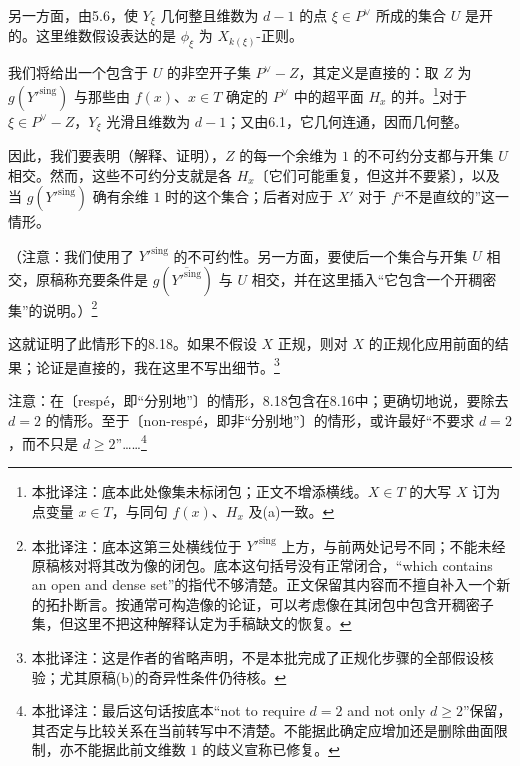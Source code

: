 \documentclass[openany]{ctexbook}
\newcommand{\note}[1]{\footnote{本批译注：#1}}
\begin{document}
另一方面，由5.6，使 $Y_\xi$ 几何整且维数为 $d-1$ 的点 $\xi\in P^\vee$ 所成的集合 $U$ 是开的。这里维数假设表达的是 $\phi_\xi$ 为 $X_{k(\xi)}$-正则。

我们将给出一个包含于 $U$ 的非空开子集 $P^\vee-Z$，其定义是直接的：取 $Z$ 为 $g(Y'^{\mathrm{sing}})$ 与那些由 $f(x)$、$x\in T$ 确定的 $P^\vee$ 中的超平面 $H_x$ 的并。\note{底本此处像集未标闭包；正文不增添横线。$X\in T$ 的大写 $X$ 订为点变量 $x\in T$，与同句 $f(x)$、$H_x$ 及(a)一致。}对于 $\xi\in P^\vee-Z$，$Y_\xi$ 光滑且维数为 $d-1$；又由6.1，它几何连通，因而几何整。

因此，我们要表明（解释、证明），$Z$ 的每一个余维为 $1$ 的不可约分支都与开集 $U$ 相交。然而，这些不可约分支就是各 $H_x$〔它们可能重复，但这并不要紧〕，以及当 $g(Y'^{\mathrm{sing}})$ 确有余维 $1$ 时的这个集合；后者对应于 $X'$ 对于 $f$“不是直纹的”这一情形。

（注意：我们使用了 $Y'^{\mathrm{sing}}$ 的不可约性。另一方面，要使后一个集合与开集 $U$ 相交，原稿称充要条件是 $g(\overline{Y'^{\mathrm{sing}}})$ 与 $U$ 相交，并在这里插入“它包含一个开稠密集”的说明。）\note{底本这第三处横线位于 $Y'^{\mathrm{sing}}$ 上方，与前两处记号不同；不能未经原稿核对将其改为像的闭包。底本这句括号没有正常闭合，“which contains an open and dense set”的指代不够清楚。正文保留其内容而不擅自补入一个新的拓扑断言。按通常可构造像的论证，可以考虑像在其闭包中包含开稠密子集，但这里不把这种解释认定为手稿缺文的恢复。}

这就证明了此情形下的8.18。如果不假设 $X$ 正规，则对 $X$ 的正规化应用前面的结果；论证是直接的，我在这里不写出细节。\note{这是作者的省略声明，不是本批完成了正规化步骤的全部假设核验；尤其原稿(b)的奇异性条件仍待核。}

注意：在〔respé，即“分别地”〕的情形，8.18包含在8.16中；更确切地说，要除去 $d=2$ 的情形。至于〔non-respé，即非“分别地”〕的情形，或许最好“不要求 $d=2$，而不只是 $d\ge2$”……\note{最后这句话按底本“not to require $d=2$ and not only $d\ge2$”保留，其否定与比较关系在当前转写中不清楚。不能据此确定应增加还是删除曲面限制，亦不能据此前文维数 $1$ 的歧义宣称已修复。}
\end{document}
